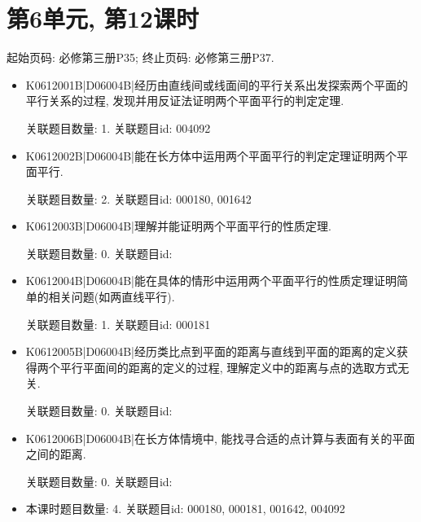 \section*{第6单元, 第12课时}
起始页码: 必修第三册P35; 终止页码: 必修第三册P37.
\begin{itemize}
\item K0612001B|D06004B|经历由直线间或线面间的平行关系出发探索两个平面的平行关系的过程, 发现并用反证法证明两个平面平行的判定定理.

关联题目数量: 1. 关联题目id: 004092

\item K0612002B|D06004B|能在长方体中运用两个平面平行的判定定理证明两个平面平行.

关联题目数量: 2. 关联题目id: 000180, 001642

\item K0612003B|D06004B|理解并能证明两个平面平行的性质定理.

关联题目数量: 0. 关联题目id: 

\item K0612004B|D06004B|能在具体的情形中运用两个平面平行的性质定理证明简单的相关问题(如两直线平行).

关联题目数量: 1. 关联题目id: 000181

\item K0612005B|D06004B|经历类比点到平面的距离与直线到平面的距离的定义获得两个平行平面间的距离的定义的过程, 理解定义中的距离与点的选取方式无关.

关联题目数量: 0. 关联题目id: 

\item K0612006B|D06004B|在长方体情境中, 能找寻合适的点计算与表面有关的平面之间的距离.

关联题目数量: 0. 关联题目id: 

\item 本课时题目数量: 4. 关联题目id: 000180, 000181, 001642, 004092

\end{itemize}

